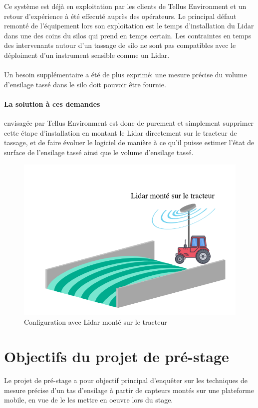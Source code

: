 \documentclass[12pt,a4paper]{report}
\begin{document}
Ce système est déjà en exploitation par les clients de Tellus Environment et un retour d'expérience à été effecuté auprès des opérateurs. Le principal défaut remonté de l'équipement lors son exploitation est le temps d'installation du Lidar dans une des coins du silos qui prend en temps certain. Les contraintes en temps des intervenants autour d'un tassage de silo ne sont pas compatibles avec le déploiment d'un instrument sensible comme un Lidar.

\paragraph{} Un besoin supplémentaire a été de plus exprimé: une mesure précise du volume d'ensilage tassé dans le silo doit pouvoir être fournie. 

\paragraph{La solution à ces demandes} envisagée par Tellus Environment est donc de purement et simplement supprimer cette étape d'installation en montant le Lidar directement sur le tracteur de tassage, et de faire évoluer le logiciel de manière à ce qu'il puisse estimer l'état de surface de l'ensilage tassé ainsi que le volume d'ensilage tassé.

\begin{figure}[H]
	\centering
	\includegraphics[width=0.7\linewidth]{img/LidarMobile}
	\caption{Configuration avec Lidar monté sur le tracteur}
	\label{fig:lidarmobile}
\end{figure}


\section{Objectifs du projet de pré-stage}
Le projet de pré-stage a pour objectif principal d'enquêter sur les techniques de mesure précise d'un tas d'ensilage à partir de capteurs montés sur une plateforme mobile, en vue de le les mettre en oeuvre lors du stage.
\end{document}
